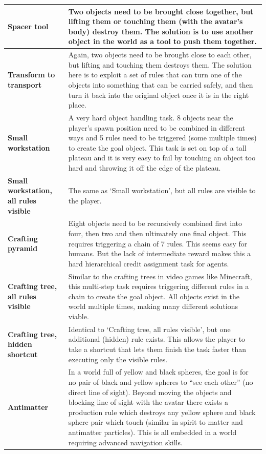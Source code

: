 \documentclass[11pt, a4paper, logo, copyright]{deepmind}
\begin{document}
\begin{appendix}
\begin{longtable}{|>{\raggedright}p{4cm}|p{12cm}|}
\textbf{Spacer tool} & Two objects need to be brought close together, but lifting them or touching them (with the avatar's body) destroy them. The solution is to use another object in the world as a tool to push them together. \\ \hline
\textbf{Transform to transport} & Again, two objects need to be brought close to each other, but lifting and touching them destroys them. The solution here is to exploit a set of rules that can turn one of the objects into something that can be carried safely, and then turn it back into the original object once it is in the right place. \\ \hline
\textbf{Small workstation} & A very hard object handling task. 8 objects near the player's spawn position need to be combined in different ways and 5 rules need to be triggered (some multiple times) to create the goal object. This task is set on top of a tall plateau and it is very easy to fail by touching an object too hard and throwing it off the edge of the plateau. \\ \hline
\textbf{Small workstation, all rules visible} & The same as `Small workstation', but all rules are visible to the player. \\ \hline
\textbf{Crafting pyramid} & Eight objects need to be recursively combined first into four, then two and then ultimately one final object. This requires triggering a chain of 7 rules. This seems easy for humans. But the lack of intermediate reward makes this a hard hierarchical credit assignment task for agents. \\ \hline
\textbf{Crafting tree, all rules visible} & Similar to the crafting trees in video games like Minecraft, this multi-step task requires triggering different rules in a chain to create the goal object. All objects exist in the world multiple times, making many different solutions viable. \\ \hline
\textbf{Crafting tree, hidden shortcut} & Identical to `Crafting tree, all rules visible', but one additional (hidden) rule exists. This allows the player to take a shortcut that lets them finish the task faster than executing only the visible rules. \\ \hline
\textbf{Antimatter} & In a world full of yellow and black spheres, the goal is for no pair of black and yellow spheres to ``see each other'' (no direct line of sight). Beyond moving the objects and blocking line of sight with the avatar there exists a production rule which destroys any yellow sphere and black sphere pair which touch (similar in spirit to matter and antimatter particles). This is all embedded in a world requiring advanced navigation skills. \\ \hline

\end{longtable}
\end{appendix}
\end{document}
